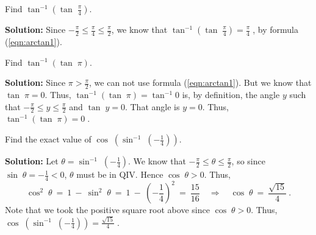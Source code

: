 \begin{center}\end{center}

\begin{exmp}
 Find $\tan^{-1} \left(\tan\;\frac{\pi}{4}\right)$.\vspace{1mm}
 \par\noindent\textbf{Solution:} Since $-\tfrac{\pi}{2} \le \tfrac{\pi}{4} \le \tfrac{\pi}{2}$, we
 know that $\tan^{-1} \left(\tan\;\frac{\pi}{4}\right) = \boxed{\frac{\pi}{4}}\;$, by formula
 (\ref{eqn:arctan1}).
\end{exmp}
\begin{exmp}\label{exmp:arctanpi}
 Find $\tan^{-1} \left(\tan\;\pi\right)$.\vspace{1mm}
 \par\noindent\textbf{Solution:} Since $\pi > \tfrac{\pi}{2}$, we can not use formula
 (\ref{eqn:arctan1}). But we know that $\tan\;\pi = 0$. Thus,
 $\tan^{-1} \left(\tan\;\pi\right) = \tan^{-1} 0$ is, by
 definition, the angle $y$ such that $-\tfrac{\pi}{2} \le y \le \tfrac{\pi}{2}$ and $\tan\;y =
 0$. That angle is $y=0$.
 Thus, $\tan^{-1} \left(\tan\;\pi \right) = \boxed{0}\;$.
\end{exmp}
\begin{exmp}
 Find the exact value of $\cos\;\left(\sin^{-1}\;\left(-\frac{1}{4}\right)\right)$.\vspace{1mm}
 \par\noindent\textbf{Solution:} Let $\theta = \sin^{-1}\;\left(-\frac{1}{4}\right)$. We know that
 $-\tfrac{\pi}{2} \le \theta \le \tfrac{\pi}{2}$, so since $\sin\;\theta = -\frac{1}{4} < 0$,
 $\theta$ must be in QIV. Hence $\cos\;\theta > 0$. Thus,
 \begin{displaymath}
  \cos^2 \;\theta ~=~ 1 ~-~ \sin^2 \;\theta ~=~ 1 ~-~ \left( -\frac{1}{4} \right)^2 ~=~\frac{15}{16}
   \quad\Rightarrow\quad \cos\;\theta ~=~ \frac{\sqrt{15}}{4} ~.
 \end{displaymath}
 Note that we took the positive square root above since $\cos\;\theta > 0$. Thus,
 $\cos\;\left(\sin^{-1}\;\left(-\frac{1}{4}\right)\right) = \boxed{\frac{\sqrt{15}}{4}}\;$.
\end{exmp}
